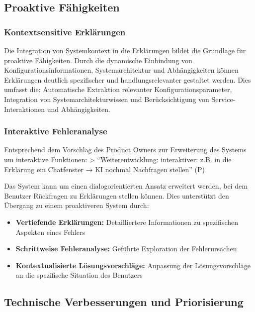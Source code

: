 \documentclass[
  a4paper,
  12pt,
  oneside,
  open=any,
  BCOR=12mm,
  DIV=14,
  parskip=half*,
  headsepline,
  footsepline,
  pointlessnumbers,
  liststotoc,
  numbers=noenddot,
  listof=totoc]{scrartcl}
\begin{document}
\subsection{Proaktive Fähigkeiten}\label{proaktive-fuxe4higkeiten}

\subsubsection{Kontextsensitive
Erklärungen}\label{kontextsensitive-erkluxe4rungen}

Die Integration von Systemkontext in die Erklärungen bildet die
Grundlage für proaktive Fähigkeiten. Durch die dynamische Einbindung von
Konfigurationsinformationen, Systemarchitektur und Abhängigkeiten können
Erklärungen deutlich spezifischer und handlungsrelevanter gestaltet
werden. Dies umfasst die: Automatische Extraktion relevanter
Konfigurationsparameter, Integration von Systemarchitekturwissen und
Berücksichtigung von Service-Interaktionen und Abhängigkeiten.

\subsubsection{Interaktive
Fehleranalyse}\label{interaktive-fehleranalyse}

Entsprechend dem Vorschlag des Product Owners zur Erweiterung des
Systems um interaktive Funktionen: \textgreater{} ``Weiterentwicklung:
interaktiver: z.B. in die Erklärung ein Chatfenster → KI nochmal
Nachfragen stellen'' (P)

Das System kann um einen dialogorientierten Ansatz erweitert werden, bei
dem Benutzer Rückfragen zu Erklärungen stellen können. Dies unterstützt
den Übergang zu einem proaktiveren System durch:

\begin{itemize}
\item
  \textbf{Vertiefende Erklärungen:} Detailliertere Informationen zu
  spezifischen Aspekten eines Fehlers
\item
  \textbf{Schrittweise Fehleranalyse:} Geführte Exploration der
  Fehlerursachen
\item
  \textbf{Kontextualisierte Lösungsvorschläge:} Anpassung der
  Lösungsvorschläge an die spezifische Situation des Benutzers
\end{itemize}

\subsection{Technische Verbesserungen und
Priorisierung}\label{technische-verbesserungen-und-priorisierung}
\end{document}
